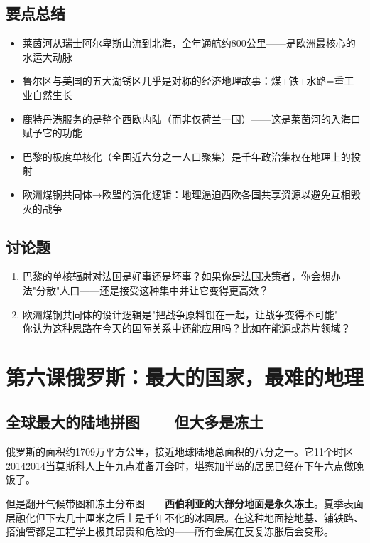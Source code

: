 \documentclass[a4paper,12pt]{ctexart}
\begin{document}
\subsection*{要点总结}
\begin{itemize}
  \item 莱茵河从瑞士阿尔卑斯山流到北海，全年通航约800公里——是欧洲最核心的水运大动脉
  \item 鲁尔区与美国的五大湖锈区几乎是对称的经济地理故事：煤+铁+水路=重工业自然生长
  \item 鹿特丹港服务的是整个西欧内陆（而非仅荷兰一国）——这是莱茵河的入海口赋予它的功能
  \item 巴黎的极度单核化（全国近六分之一人口聚集）是千年政治集权在地理上的投射
  \item 欧洲煤钢共同体→欧盟的演化逻辑：地理逼迫西欧各国共享资源以避免互相毁灭的战争
\end{itemize}

\subsection*{讨论题}
\begin{enumerate}
  \item 巴黎的单核辐射对法国是好事还是坏事？如果你是法国决策者，你会想办法"分散"人口——还是接受这种集中并让它变得更高效？
  \item 欧洲煤钢共同体的设计逻辑是"把战争原料锁在一起，让战争变得不可能"——你认为这种思路在今天的国际关系中还能应用吗？比如在能源或芯片领域？
\end{enumerate}

\newpage

\section{\textcolor{orange!80!black}{第六课\quad 俄罗斯：最大的国家，最难的地理}}

\subsection*{全球最大的陆地拼图——但大多是冻土}

俄罗斯的面积约1709万平方公里，接近地球陆地总面积的八分之一。它11个时区\u2014\u2014当莫斯科人上午九点准备开会时，堪察加半岛的居民已经在下午六点做晚饭了。

但是翻开气候带图和冻土分布图——\textbf{西伯利亚的大部分地面是永久冻土}。夏季表面层融化但下去几十厘米之后土是千年不化的冰固层。在这种地面挖地基、铺铁路、搭油管都是工程学上极其昂贵和危险的——所有金属在反复冻胀后会变形。
\end{document}

